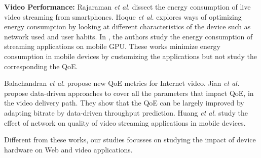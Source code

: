 
\noindent\textbf{Video Performance:}
Rajaraman \emph{et al.} \cite{rajaraman2014energy} dissect the energy consumption of live video streaming from smartphones.
Hoque \emph{et al.} \cite{hoque2013dissecting} explores ways of optimizing energy consumption by looking at different characteristics of the device such as network used and user habits.
In \cite{stokke2015energy}, the authors study the energy consumption of streaming applications on mobile GPU.
These works minimize energy consumption in mobile devices by customizing the applications but not study the corresponding the QoE.

Balachandran \emph{et al.} \cite{balachandran2012quest} propose new QoE metrics for Internet video. 
Jian \emph{et al.} \cite{jiang2017pytheas, sun2016cs2p} propose data-driven approaches to cover all the parameters that impact QoE, in the video delivery path. They show that the QoE can be largely improved by adapting bitrate by data-driven throughput prediction.
Huang \emph{et al.} \cite{huang2010anatomizing} study the effect of network on quality of video streaming applications in mobile devices.

Different from these works, our studies focusses on studying the impact of device hardware on Web and video applications.


